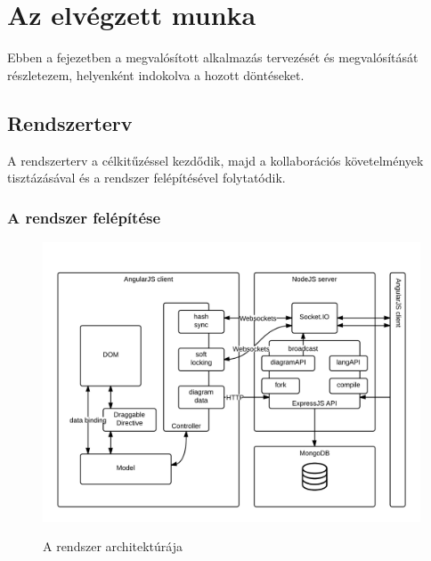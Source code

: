 \chapter{Az elvégzett munka}

Ebben a fejezetben a megvalósított alkalmazás tervezését és megvalósítását részletezem, helyenként indokolva a hozott döntéseket.

\section{Rendszerterv}

A rendszerterv a célkitűzéssel kezdődik, majd a kollaborációs követelmények tisztázásával és a rendszer felépítésével folytatódik.





\subsection{A rendszer felépítése}

\begin{figure}[!ht]
\centering
\includegraphics[width=\textwidth,height=\textheight,keepaspectratio]{figures/Rendszerterv.png}\\
\caption{A rendszer architektúrája}
\label{fig:arch}
\end{figure}

